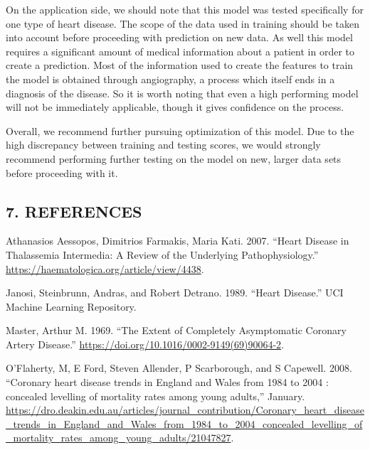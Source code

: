 \documentclass[
  letterpaper,
  DIV=11,
  numbers=noendperiod]{scrartcl}
\newlength{\cslhangindent}
\newenvironment{CSLReferences}[2] %
 {\begin{list}{}{%
  \setlength{\itemindent}{0pt}
  \setlength{\leftmargin}{0pt}
  \setlength{\parsep}{0pt}
  \ifodd #1
   \setlength{\leftmargin}{\cslhangindent}
   \setlength{\itemindent}{-1\cslhangindent}
  \fi
  \setlength{\itemsep}{#2\baselineskip}}}
 {\end{list}}
\begin{document}
On the application side, we should note that this model was tested
specifically for one type of heart disease. The scope of the data used
in training should be taken into account before proceeding with
prediction on new data. As well this model requires a significant amount
of medical information about a patient in order to create a prediction.
Most of the information used to create the features to train the model
is obtained through angiography, a process which itself ends in a
diagnosis of the disease. So it is worth noting that even a high
performing model will not be immediately applicable, though it gives
confidence on the process.

Overall, we recommend further pursuing optimization of this model. Due
to the high discrepancy between training and testing scores, we would
strongly recommend performing further testing on the model on new,
larger data sets before proceeding with it.

\subsection*{7. REFERENCES}\label{references}

\label{refs}
\begin{CSLReferences}{1}{0}
Athanasios Aessopos, Dimitrios Farmakis, Maria Kati. 2007. {``Heart
Disease in Thalassemia Intermedia: A Review of the Underlying
Pathophysiology.''} \url{https://haematologica.org/article/view/4438}.

Janosi, Steinbrunn, Andras, and Robert Detrano. 1989. {``{Heart
Disease}.''} UCI Machine Learning Repository.

Master, Arthur M. 1969. {``The Extent of Completely Asymptomatic
Coronary Artery Disease.''}
\url{https://doi.org/10.1016/0002-9149(69)90064-2}.

O'Flaherty, M, E Ford, Steven Allender, P Scarborough, and S Capewell.
2008. {``{Coronary heart disease trends in England and Wales from 1984
to 2004 : concealed levelling of mortality rates among young adults},''}
January.
\url{https://dro.deakin.edu.au/articles/journal_contribution/Coronary_heart_disease_trends_in_England_and_Wales_from_1984_to_2004_concealed_levelling_of_mortality_rates_among_young_adults/21047827}.

\end{CSLReferences}
\end{document}

